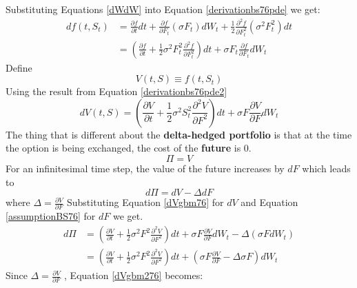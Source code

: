\documentclass[12pt]{article}
\numberwithin{equation}{section}
\begin{document}
Substituting Equations \ref{dWdW} into Equation 	\ref{derivationbs76pde} we get:
\begin{equation}
	\begin{aligned}
		df(t,S_t)  &= \frac{\partial f}{\partial t}dt
		+ \frac{\partial f}{\partial F_t}
		(\sigma F_t )dW_t
		+ \frac{1}{2}
		\frac{\partial^2 f}{\partial F_t^2}
		(\sigma^2F_t^2)dt \\
		&= (\frac{\partial f}{\partial t} + 
		\frac{1}{2}\sigma^2F_t^2\frac{\partial^2 f}{\partial F_t^2}) dt + \sigma F_t \frac{\partial f}{\partial F_t}dW_t
	\end{aligned}
	\label{derivationbs76pde2}
\end{equation}
Define 
\begin{equation}
	V(t,S)  \equiv f(t,S_t)
\end{equation}
Using the result from Equation \ref{derivationbs76pde2}
\begin{equation}
	dV(t,S) = (\frac{\partial V}{\partial t} +
	\frac{1}{2}\sigma^2S_t^2\frac{\partial^2 V}{\partial F^2}) dt + \sigma F \frac{\partial V}{\partial F}dW_t
	\label{dVgbm76}
\end{equation}
\newline
The thing that is different about the \textbf{delta-hedged portfolio} is that at the time the option is being exchanged, the cost of the \textbf{future} is $0$. 
\begin{equation}
	\Pi = V 
	\label{portfolioDef76}
\end{equation}
For an infinitesimal time step, the value of the future increases by $dF$ which leads to
\begin{equation}
	d\Pi = dV - \Delta dF 
\end{equation} where $\Delta = \frac{\partial V}{\partial F}$
Substituting Equation \ref{dVgbm76} for $dV$ and Equation \ref{assumptionBS76} for $dF$ we get. 
\begin{equation}
	\begin{aligned}
		d\Pi &= (\frac{\partial V}{\partial t} +
		\frac{1}{2}\sigma^2F^2\frac{\partial^2 V}{\partial F^2}) dt + \sigma F \frac{\partial V}{\partial F}dW_t - \Delta(\sigma F dW_t) \\
		&= (\frac{\partial V}{\partial t} +
		\frac{1}{2}\sigma^2F^2\frac{\partial^2 V}{\partial F^2}) dt + (\sigma F \frac{\partial V}{\partial F} - \Delta \sigma F ) dW_t
	\end{aligned}
	\label{dVgbm276}
\end{equation}
Since  $\Delta = \frac{\partial V}{\partial F}$ , Equation \ref{dVgbm276} becomes:
\end{document}
